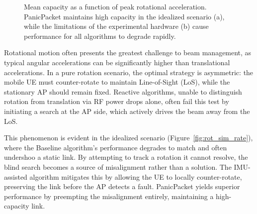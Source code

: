 \documentclass[fleqn,10pt]{wlscirep}
\newcommand{\legline}[2]{%
    \tikz[baseline=-0.5ex]{
        \draw[#1, #2, line width=1.5pt] (0,0) -- (0.5,0);
    }%
}
\newcommand{\legmark}[2]{%
    \tikz[baseline=-0.5ex]{
        \node[#2, fill=#1, draw=#1, inner sep=2pt, scale=0.8] at (0,0) {};
    }%
}
\begin{document}
\begin{figure}[ht!]
    
    
    \caption{Mean capacity as a function of peak rotational acceleration. PanicPacket maintains high capacity in the idealized scenario (a), while the limitations of the experimental hardware (b) cause performance for all algorithms to degrade rapidly.}
    \label{fig:rotational_rate}
\end{figure}

Rotational motion often presents the greatest challenge to beam management, as typical angular accelerations can be significantly higher than translational accelerations. In a pure rotation scenario, the optimal strategy is asymmetric: the mobile UE must counter-rotate to maintain Line-of-Sight (LoS), while the stationary AP should remain fixed. Reactive algorithms, unable to distinguish rotation from translation via RF power drops alone, often fail this test by initiating a search at the AP side, which actively drives the beam away from the LoS.

This phenomenon is evident in the idealized scenario (Figure~\ref{fig:rot_sim_rate}), where the Baseline algorithm's performance degrades to match and often undershoo a static link. By attempting to track a rotation it cannot resolve, the blind search becomes a source of misalignment rather than a solution. The IMU-assisted algorithm mitigates this by allowing the UE to locally counter-rotate, preserving the link before the AP detects a fault. PanicPacket yields superior performance by preempting the misalignment entirely, maintaining a high-capacity link.
\end{document}
